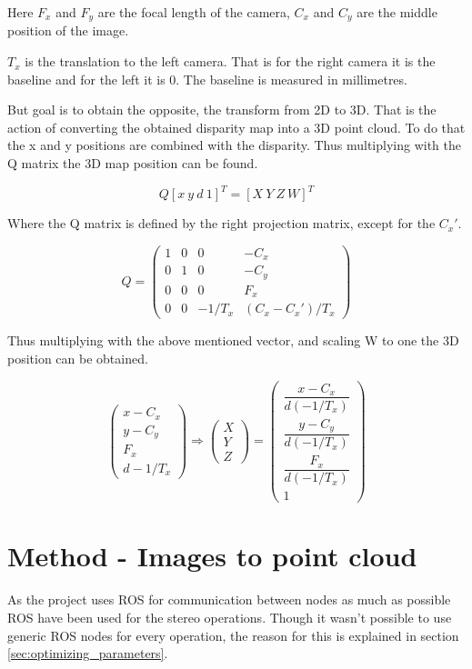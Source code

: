 Here $F_{x}$ and $F_{y}$ are the focal length of the camera, $C_{x}$ and $C_{y}$ are the middle position of the image.

$T_{x}$ is the translation to the left camera. That is for the right camera it is the baseline and for the left it is 0. The baseline is measured in millimetres. 

But goal is to obtain the opposite, the transform from 2D to 3D. That is the action of converting the obtained disparity map into a 3D point cloud. To do that the x and y positions are combined with the disparity. Thus multiplying with the Q matrix the 3D map position can be found.

\[ Q [ x \ y \ d \ 1 ]^{T} = [ X \ Y \ Z \ W ]^{T} \]

Where the Q matrix is defined by the right projection matrix, except for the $C_{x}'$.

\[
Q =
 \begin{pmatrix}
  1 & 0 & 0 & -C_{x} \\
  0 & 1 & 0 & -C_{y} \\
  0 & 0 & 0 & F_{x} \\
  0 & 0 & -1/T_{x} & (C_{x}-C_{x}')/T_{x} 
 \end{pmatrix}
\]

Thus multiplying with the above mentioned vector, and scaling W to one the 3D position can be obtained.

\[
 \begin{pmatrix}
  x - C_{x} \\
  y - C_{y} \\
  F_{x} \\
  d-1/T_{x} 
 \end{pmatrix}
 \Rightarrow
  \begin{pmatrix}  
  X\\
  Y\\
  Z
 \end{pmatrix}
 =
 \begin{pmatrix}
  \dfrac{x - C_{x}}{ d(-1/T_{x})}  \\
  \dfrac{y - C_{y} }{ d(-1/T_{x})}\\
  \dfrac{F_{x}}{ d(-1/T_{x})}\\
  1
 \end{pmatrix}
\]

\section{Method - Images to point cloud}

As the project uses ROS for communication between nodes as much as possible ROS have been used for the stereo operations. Though it wasn't possible to use generic ROS nodes for every operation, the reason for this is explained in section \ref{sec:optimizing_parameters}. 

